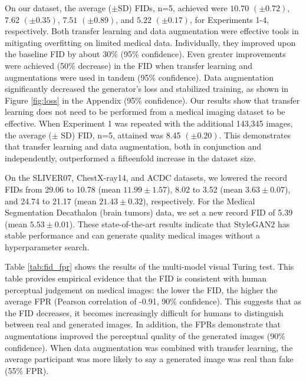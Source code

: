 \documentclass[runningheads]{llncs}
\begin{document}
On our dataset, the average ($\pm$SD) FIDs, n=5, achieved were $10.70$ $(\pm 0.72)$, $7.62$ $(\pm 0.35)$, $7.51$ $(\pm 0.89)$, and $5.22$ $(\pm 0.17)$, for Experiments 1-4, respectively.
Both transfer learning and data augmentation were effective tools in mitigating overfitting on limited medical data.
Individually, they improved upon the baseline FID by about 30\% (95\% confidence).
Even greater improvements were achieved (50\% decrease) in the FID when transfer learning and augmentations were used in tandem (95\% confidence).
Data augmentation significantly decreased the generator's loss and stabilized training, as shown in Figure \ref{fig:loss} in the Appendix (95\% confidence).
Our results show that transfer learning does not need to be performed from a medical imaging dataset to be effective. When Experiment 1 was repeated with the additional 143,345 images, the average ($\pm$ SD) FID, n=5, attained was 8.45 $(\pm 0.20)$.
This demonstrates that transfer learning and data augmentation, both in conjunction and independently, outperformed a fifteenfold increase in the dataset size.

On the SLIVER07, ChestX-ray14, and ACDC datasets, we lowered the record FIDs from 29.06 to 10.78 (mean $11.99\pm 1.57$), 8.02 to 3.52 (mean $3.63\pm 0.07$), and 24.74 to 21.17 (mean $21.43\pm 0.32$), respectively.
For the Medical Segmentation Decathalon (brain tumors) data, we set a new record FID of 5.39 (mean $5.53\pm 0.01$).
These state-of-the-art results indicate that StyleGAN2 has stable performance and can generate quality medical images without a hyperparameter search.

Table \ref{tab:fid_fpr} shows the results of the multi-model visual Turing test.
This table provides empirical evidence that the FID is consistent with human perceptual judgement on medical images:
the lower the FID, the higher the average FPR (Pearson correlation of -0.91, 90\% confidence). This suggests that as the FID decreases, it becomes increasingly difficult for humans to distinguish between real and generated images.
In addition, the FPRs demonstrate that augmentations improved the perceptual quality of the generated images (90\% confidence).
When data augmentation was combined with transfer learning, the average participant was more likely to say a generated image was real than fake (55\% FPR).
\end{document}
